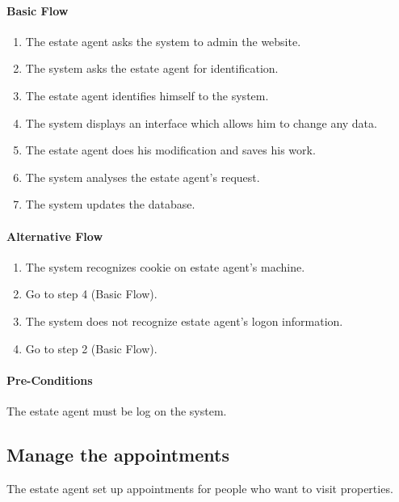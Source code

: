 \documentclass[a4paper,12pt]{article}
\begin{document}
\paragraph{Basic Flow}
\begin{enumerate}
\item The estate agent asks the system to admin the website.
\item The system asks the estate agent for identification.
\item The estate agent identifies himself to the system.
\item The system displays an interface which allows him to change any data.
\item The estate agent does his modification and saves his work.
\item The system analyses the estate agent's request.
\item The system updates the database.
\end{enumerate}
\paragraph{Alternative Flow}
\begin{enumerate}
\item The system recognizes cookie on estate agent's machine. 
\item Go to step 4 (Basic Flow).
\item The system does not recognize estate agent's logon information.
\item Go to step 2 (Basic Flow).
\end{enumerate}
\paragraph{Pre-Conditions}
The estate agent must be log on the system.

\subsection{Manage the appointments}
The estate agent set up appointments for people who want to visit properties.
\end{document}
